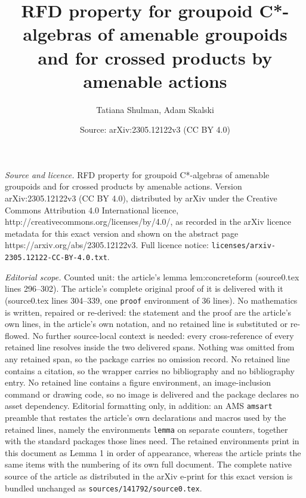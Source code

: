 \documentclass[10pt,a4paper]{amsart}
\title{RFD property for groupoid C*-algebras of amenable groupoids and for crossed products by amenable actions}
\author{Tatiana Shulman, Adam Skalski}
\date{Source: arXiv:2305.12122v3 (CC BY 4.0)}
\begin{document}
\maketitle

\noindent\emph{Source and licence.} RFD property for groupoid C*-algebras of amenable groupoids and for crossed products by amenable actions. Version arXiv:2305.12122v3 (CC BY 4.0), distributed by arXiv under the Creative Commons Attribution 4.0 International licence, http://creativecommons.org/licenses/by/4.0/, as recorded in the arXiv licence metadata for this exact version and shown on the abstract page https://arxiv.org/abs/2305.12122v3. Full licence notice: \texttt{licenses/arxiv-2305.12122-CC-BY-4.0.txt}.\par\smallskip

\noindent\textit{Editorial scope.} Counted unit: the article's lemma lem:concreteform (source0.tex lines 296--302). The article's complete original proof of it is delivered with it (source0.tex lines 304--339, one \texttt{proof} environment of 36 lines). No mathematics is written, repaired or re-derived: the statement and the proof are the article's own lines, in the article's own notation, and no retained line is substituted or re-flowed.  No further source-local context is needed: every cross-reference of every retained line resolves inside the two delivered spans.  Nothing was omitted from any retained span, so the package carries no omission record.  No retained line contains a citation, so the wrapper carries no bibliography and no bibliography entry.  No retained line contains a figure environment, an image-inclusion command or drawing code, so no image is delivered and the package declares no asset dependency.  Editorial formatting only, in addition: an AMS \texttt{amsart} preamble that restates the article's own declarations and macros used by the retained lines, namely the environments \texttt{lemma} on separate counters, together with the standard packages those lines need.  The retained environments print in this document as Lemma 1 in order of appearance, whereas the article prints the same items with the numbering of its own full document.  The complete native source of the article as distributed in the arXiv e-print for this exact version is bundled unchanged as \texttt{sources/141792/source0.tex}.
\end{document}
